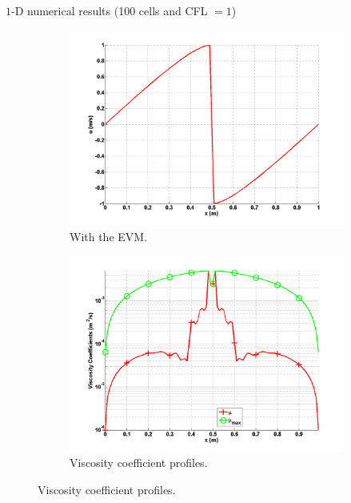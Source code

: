 \documentclass[xcolor=dvipsnames,10pt]{beamer}
\begin{document}
\begin{frame}{$1$-D numerical results (100 cells and CFL $=1$)}
\begin{figure}[H]
        \begin{subfigure}[b]{0.37\textwidth}
                \centering
                \includegraphics[width=\textwidth]{../figures/1D_sol_ev.png}
                \caption{With the EVM.}
                \label{fig:1d_burger_ev}
        \end{subfigure}
        \begin{subfigure}[b]{0.37\textwidth}
                \centering
                \includegraphics[width=\textwidth]{../figures/1D_visc.png}
                \caption{Viscosity coefficient profiles.}
                \label{fig:1d_burger_visc}
        \end{subfigure}
\end{figure}
\end{frame}
\end{document}
